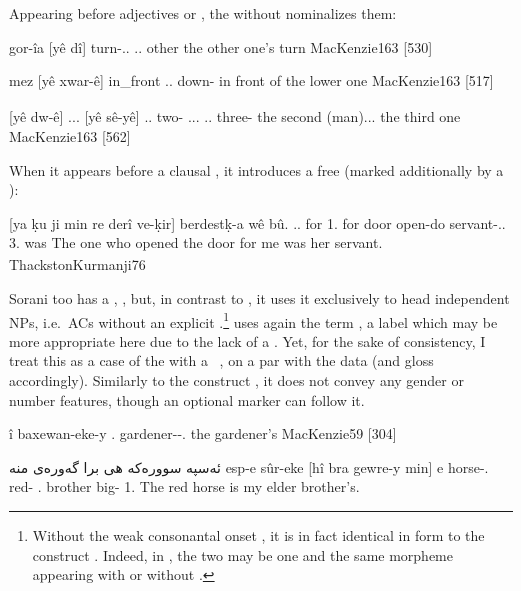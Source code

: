 Appearing before adjectives or , the \lnk* \ez* without \prim nominalizes them:

{gor-îa \zero{} [yê dî]}
{turn-\ez..\fem{} \zero{} \lnk.\ez.\masc{} other}
{the other one's turn}
{MacKenzie}{163 {[530]}}

{mez \zero{} [yê xwar-ê]}
{in\_front \zero{} \lnk.\ez.\masc{} down-\adj}
{in front of the lower one\textsubscript{\masc}}
{MacKenzie}{163 {[517]}}


{\zero{} [yê dw-ê] ... \zero{} [yê sê-yê]}
{\zero{} \lnk.\ez.\masc{} two-\ord{} ... \zero{} \lnk.\ez.\masc{} three-\ord{}}
{the second (man)... the third one}
{MacKenzie}{163 {[562]}}

When it appears before a clausal \secn, it introduces a free  (marked additionally by a \rel*):

{\zero{} [ya ḳu ji min re derî ve-ḳir] berdestḳ-a wê bû.}
{\zero{} \lnk.\ez.\fem{} \rel{} for 1\sg.\obl{} for door open-do servant-\ez..\fem{} 3\fem.\obl{} was}
{The one\textsubscript{\fem} who opened the door for me was her servant.}
{ThackstonKurmanji}{76}

Sorani too has a \lnk* \ez*,  , but, in contrast to \Kur, it uses it exclusively  to head independent NPs, i.e.\ ACs without an explicit \prim.\footnote{Without the weak consonantal onset , it is in fact identical in form to the \Sor construct \ez*. Indeed, in \Sor, the two may be one and the same morpheme appearing with or without \prims.} \citet[66]{MacKenzie} uses again the term , a label which may be more appropriate here due to the lack of a \prim. Yet,  for the sake of consistency, I treat this as a case of the \lnk* \ez* with a \zero\ \prim, on a par with the \Kur data (and gloss accordingly). Similarly to the \Sor construct \ez*, it  does not convey any gender or number features, though an optional \pl* marker can follow it.

{\zero{} î baxewan-eke-y}
{\zero{} \lnk.\ez{} gardener--\obl.\masc{}}
{the gardener's}
{MacKenzie}{59 {[304]}}

{ئەسپە سوورەكە هی برا گەورەی منە }
{esp-e sûr-eke \zero{} [hî bra gewre-y min] \cb{}e}
{horse-\ez. red- \zero{} \lnk.\ez{} brother big-\ez{} 1\sg.\obl{} \cb{}\cop}
{The red horse is my elder brother's.}
{\citep[64]{BlauSorani}}

